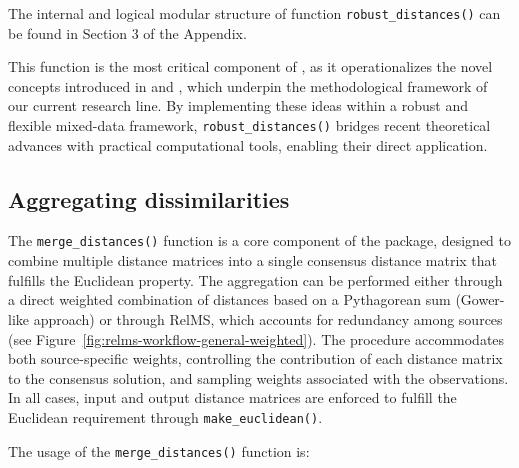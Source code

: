The internal and logical modular structure of function \texttt{robust\_distances()} can be found in Section 3
of the Appendix.

This function is the most critical component of , as it operationalizes the novel concepts introduced in \cite{boj2024robustification} and \cite{Boj2026}, which underpin the methodological framework of our current research line. By implementing these ideas within a robust and flexible mixed-data framework, \texttt{robust\_distances()} bridges recent theoretical advances with practical computational tools, enabling their direct application.

{\subsection{Aggregating dissimilarities}}
The \texttt{merge\_distances()} function is a core component of the  package, designed to combine multiple distance matrices into a single consensus distance matrix that fulfills the Euclidean property. The aggregation can be performed either through a direct weighted combination of distances based on a Pythagorean sum (Gower-like approach) or through RelMS, which accounts for redundancy among sources (see Figure~\ref{fig:relms-workflow-general-weighted}). The procedure accommodates both source-specific weights, controlling the contribution of each distance matrix to the consensus solution, and sampling weights associated with the observations. In all cases, input and output distance matrices are enforced to fulfill the Euclidean requirement through \texttt{make\_euclidean()}.

The usage of the \texttt{merge\_distances()} function is: 

